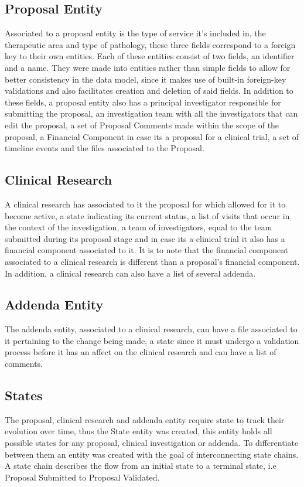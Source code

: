 \subsection{Proposal Entity}
Associated to a proposal entity is the type of service it's included in, the therapeutic area and type of pathology, these three fields correspond to a foreign key to their own entities. Each of these entities consist of two fields, an identifier and a name. They were made into entities rather than simple fields to allow for better consistency in the data model, since it makes use of built-in foreign-key validations and also facilitates creation and deletion of said fields. In addition to these fields, a proposal entity also has a principal investigator responsible for submitting the proposal, an investigation team with all the investigators that can edit the proposal, a set of Proposal Comments made within the scope of the proposal, a Financial Component in case its a proposal for a clinical trial, a set of timeline events and the files associated to the Proposal. 


\subsection{Clinical Research}
A clinical research has associated to it the proposal for which allowed for it to become active, a state indicating its current status, a list of visits that occur in the context of the investigation, a team of investigators, equal to the team submitted during its proposal stage and in case its a clinical trial it also has a financial component associated to it. It is to note that the financial component associated to a clinical research is different than a proposal's financial component. In addition, a clinical research can also have a list of several addenda.



\subsection{Addenda Entity}\label{subsec:addenda-entity}
The addenda entity, associated to a clinical research, can have a file associated to it pertaining to the change being made, a state since it must undergo a validation process before it has an affect on the clinical research and can have a list of comments.


\subsection{States}\label{subsec:states-entity}
The proposal, clinical research and addenda entity require state to track their evolution over time, thus the State entity was created, this entity holds all possible states for any proposal, clinical investigation or addenda. To differentiate between them an entity was created with the goal of interconnecting state chains. A state chain describes the flow from an initial state to a terminal state, i.e Proposal Submitted to Proposal Validated. 


